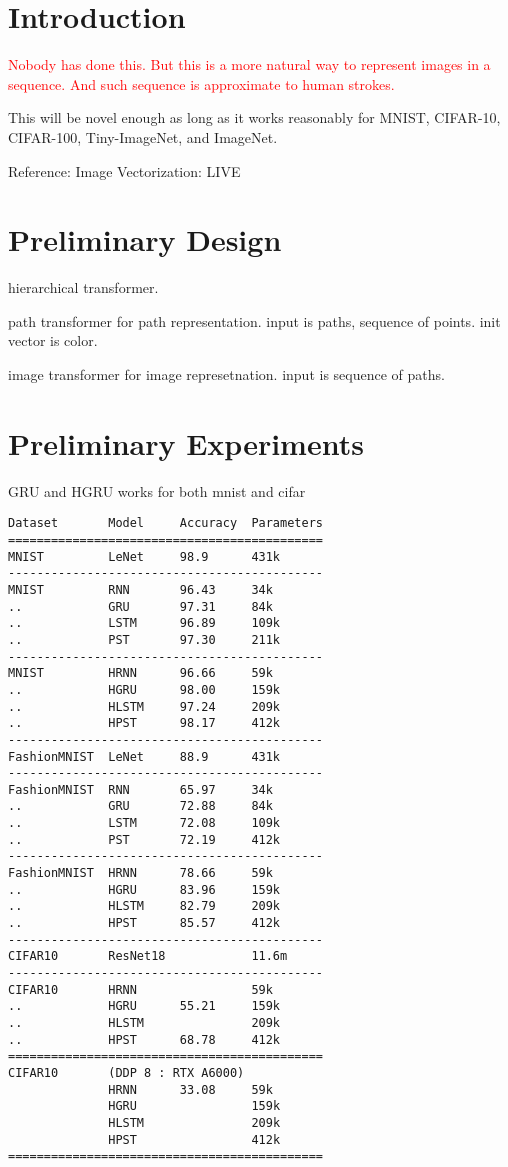 \documentclass[10pt,twocolumn,letterpaper]{article}
\begin{document}
\section{Introduction}
\label{sec:intro}

\textcolor{red}{Nobody has done this. But this is a more natural way to represent images in a sequence. 
And such sequence is approximate to human strokes.}

This will be novel enough as long as it works reasonably for MNIST, CIFAR-10,
CIFAR-100, Tiny-ImageNet, and ImageNet.

Reference: Image Vectorization: LIVE \cite{live}

\section{Preliminary Design}

hierarchical transformer.

path transformer for path representation. input is paths, sequence of points. init vector is color.

image transformer for image represetnation. input is sequence of paths.

\section{Preliminary Experiments}

GRU and HGRU works for both mnist and cifar

\begin{verbatim}
Dataset       Model     Accuracy  Parameters
============================================
MNIST         LeNet     98.9      431k
--------------------------------------------
MNIST         RNN       96.43     34k
..            GRU       97.31     84k
..            LSTM      96.89     109k
..            PST       97.30     211k
--------------------------------------------
MNIST         HRNN      96.66     59k
..            HGRU      98.00     159k
..            HLSTM     97.24     209k
..            HPST      98.17     412k
--------------------------------------------
FashionMNIST  LeNet     88.9      431k
--------------------------------------------
FashionMNIST  RNN       65.97     34k
..            GRU       72.88     84k
..            LSTM      72.08     109k
..            PST       72.19     412k
--------------------------------------------
FashionMNIST  HRNN      78.66     59k
..            HGRU      83.96     159k
..            HLSTM     82.79     209k
..            HPST      85.57     412k
--------------------------------------------
CIFAR10       ResNet18            11.6m
--------------------------------------------
CIFAR10       HRNN                59k
..            HGRU      55.21     159k
..            HLSTM               209k
..            HPST      68.78     412k
============================================
CIFAR10       (DDP 8 : RTX A6000)
              HRNN      33.08     59k
              HGRU                159k
              HLSTM               209k
              HPST                412k
============================================
\end{verbatim}


{\small


}
\end{document}
